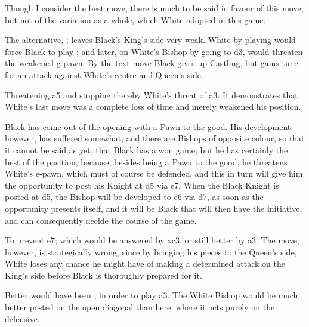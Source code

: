 \documentclass[10pt,twoside]{article}
\begin{document}

Though I consider  the best move, there is much to be said in favour of this move, but not of the variation as a whole, which White adopted in this game.


The alternative, ; leaves Black's King's side very weak. White by playing  would force Black to play ; and later, on White's Bishop by going to d3, would threaten the weakened g-pawn. By the text move Black gives up Castling, but gains time for an attack against White's centre and Queen's side.


Threatening \figQ a5 and stopping thereby White's threat of \figB a3. It demonstrates that White's last move was a complete loss of time and merely weakened his position.


\board

Black has come out of the opening with a Pawn to the good. His development, however, has suffered somewhat, and there are Bishops of opposite colour, so that it cannot be said as yet, that Black has a won game; but he has certainly the best of the position, because, besides being a Pawn to the good, he threatens White's e-pawn, which must of course be defended, and this in turn will give him the opportunity to post his Knight at d5 via e7. When the Black Knight is posted at d5, the Bishop will be developed to c6 via d7, as soon as the opportunity presents itself, and it will be Black that will then have the initiative, and can consequently decide the course of the game.


To prevent \figN e7; which would be answered by \figN xc3, or still better by \figB a3. The move, however, is strategically wrong, since by bringing his pieces to the Queen's side, White loses any chance he might have of making a determined attack on the King's side before Black is thoroughly prepared for it.


Better would have been , in order to play \figB a3. The White Bishop would be much better posted on the open diagonal than here, where it acts purely on the defensive.
\end{document}

